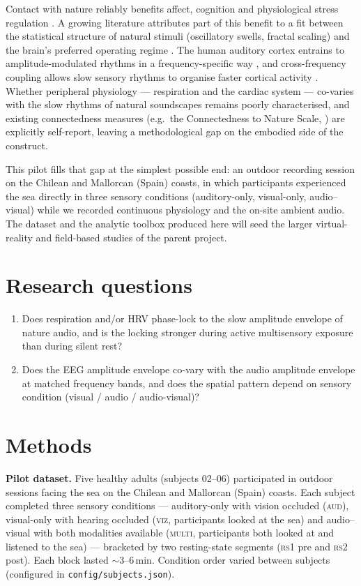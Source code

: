 \documentclass[11pt,a4paper]{article}
\begin{document}
Contact with nature reliably benefits affect, cognition and physiological
stress regulation \citep{bratman2015,hartig2014}. A growing literature
attributes part of this benefit to a fit between the statistical structure of
natural stimuli (oscillatory swells, fractal scaling) and the brain's
preferred operating regime \citep{taylor2016}. The human auditory cortex
entrains to amplitude-modulated rhythms in a frequency-specific way
\citep{nozaradan2011,gordon2017}, and cross-frequency coupling allows slow
sensory rhythms to organise faster cortical activity \citep{lakatos2008,
carpentier2020}. Whether peripheral physiology --- respiration and the
cardiac system --- co-varies with the slow rhythms of natural soundscapes
remains poorly characterised, and existing connectedness measures (e.g.\ the
Connectedness to Nature Scale, \citealt{mayer2004}) are explicitly
self-report, leaving a methodological gap on the embodied side of the
construct.

This pilot fills that gap at the simplest possible end: an outdoor
recording session on the Chilean and Mallorcan (Spain) coasts, in which
participants experienced the sea directly in three sensory conditions
(auditory-only, visual-only, audio--visual) while we recorded continuous
physiology and the on-site ambient audio. The dataset and the analytic
toolbox produced here will seed the larger virtual-reality and field-based
studies of the parent project.

\section{Research questions}

\begin{enumerate}
\item Does respiration and/or HRV phase-lock to the slow amplitude envelope
of nature audio, and is the locking stronger during active multisensory
exposure than during silent rest?
\item Does the EEG amplitude envelope co-vary with the audio amplitude
envelope at matched frequency bands, and does the spatial pattern depend on
sensory condition (visual / audio / audio-visual)?
\end{enumerate}

\section{Methods}

\textbf{Pilot dataset.} Five healthy adults (subjects 02--06) participated
in outdoor sessions facing the sea on the Chilean and Mallorcan (Spain)
coasts. Each subject completed three sensory conditions --- auditory-only
with vision occluded (\textsc{aud}), visual-only with hearing occluded
(\textsc{viz}, participants looked at the sea) and audio--visual with both
modalities available (\textsc{multi}, participants both looked at and
listened to the sea) --- bracketed by two resting-state segments
(\textsc{rs1} pre and \textsc{rs2} post). Each block lasted $\sim$3--6\,min.
Condition order varied between subjects (configured in
\texttt{config/subjects.json}).
\end{document}
